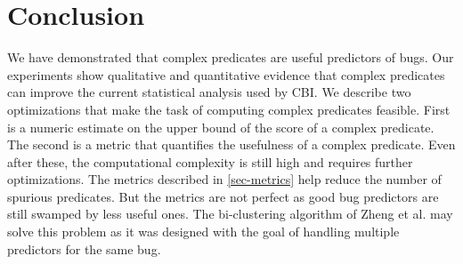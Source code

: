 
\section{Conclusion}
\label{sec-conc}
We have demonstrated that complex predicates are useful predictors of bugs.  Our experiments show qualitative and quantitative evidence that complex predicates can improve the current statistical analysis used by CBI\@.  We describe two optimizations that make the task of computing complex predicates feasible.  First is a numeric estimate on the upper bound of the score of a complex predicate.  The second is a metric that quantifies the usefulness of a complex predicate.  Even after these, the computational complexity is still high and requires further optimizations.  The metrics described in \autoref{sec-metrics} help reduce the number of spurious predicates.  But the metrics are not perfect as good bug predictors are still swamped by less useful ones.  The bi-clustering algorithm of Zheng et al. \cite{Zheng:2006:SDSIMB} may solve this problem as it was designed with the goal of handling multiple predictors for the same bug.

